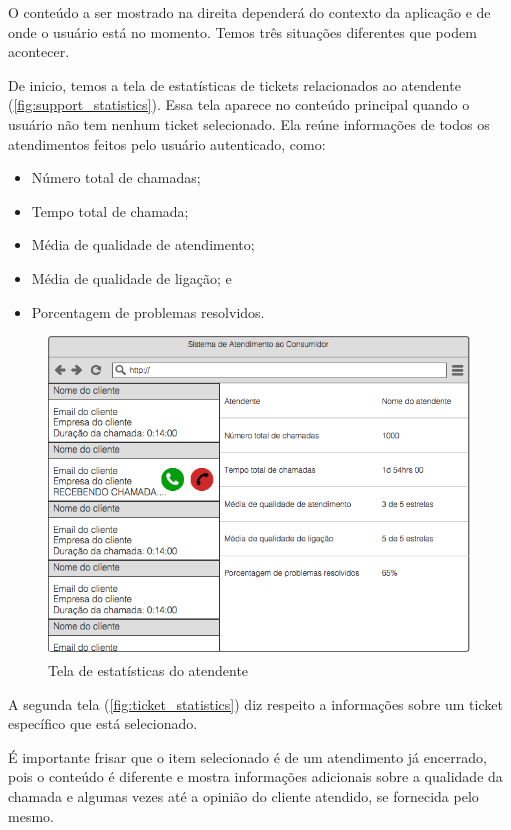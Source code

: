 O conteúdo a ser mostrado na direita dependerá do contexto da aplicação e de onde o usuário está no momento. Temos três situações diferentes que podem acontecer.

De inicio, temos a tela de estatísticas de tickets relacionados ao atendente (\autoref{fig:support_statistics}). Essa tela aparece no conteúdo principal quando o usuário não tem nenhum ticket selecionado. Ela reúne informações de todos os atendimentos feitos pelo usuário autenticado, como:

\begin{itemize}
  \item Número total de chamadas;
  \item Tempo total de chamada;
  \item Média de qualidade de atendimento;
  \item Média de qualidade de ligação; e
  \item Porcentagem de problemas resolvidos.
\end{itemize}

\begin{figure}[ht!]
	\centering
    \includegraphics[scale=0.4]{figures/prototypes/support-statistics.png} 
	\caption{Tela de estatísticas do atendente}
	\label{fig:support_statistics}
\end{figure}

A segunda tela (\autoref{fig:ticket_statistics}) diz respeito a informações sobre um ticket específico que está selecionado.

É importante frisar que o item selecionado é de um atendimento já encerrado, pois o conteúdo é diferente e mostra informações adicionais sobre  a qualidade da chamada e algumas vezes até a opinião do cliente atendido, se fornecida pelo mesmo.

